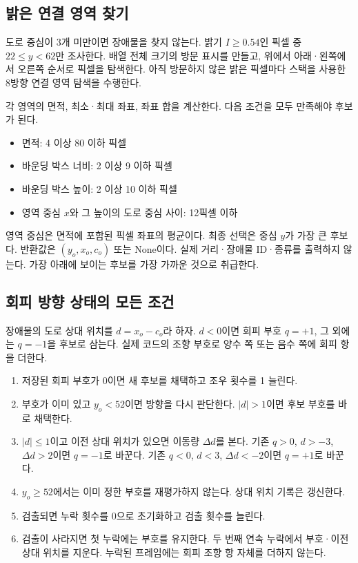 \documentclass[11pt,a4paper]{article}
\begin{document}
\subsection{밝은 연결 영역 찾기}
도로 중심이 3개 미만이면 장애물을 찾지 않는다. 밝기 $I\ge0.54$인 픽셀 중 $22\le y<62$만 조사한다. 배열 전체 크기의 방문 표시를 만들고, 위에서 아래·왼쪽에서 오른쪽 순서로 픽셀을 탐색한다. 아직 방문하지 않은 밝은 픽셀마다 스택을 사용한 8방향 연결 영역 탐색을 수행한다.

각 영역의 면적, 최소·최대 좌표, 좌표 합을 계산한다. 다음 조건을 모두 만족해야 후보가 된다.
\begin{itemize}
\item 면적: 4 이상 80 이하 픽셀
\item 바운딩 박스 너비: 2 이상 9 이하 픽셀
\item 바운딩 박스 높이: 2 이상 10 이하 픽셀
\item 영역 중심 $x$와 그 높이의 도로 중심 사이: 12픽셀 이하
\end{itemize}
영역 중심은 면적에 포함된 픽셀 좌표의 평균이다. 최종 선택은 중심 $y$가 가장 큰 후보다. 반환값은 $(y_o,x_o,c_o)$ 또는 None이다. 실제 거리·장애물 ID·종류를 출력하지 않는다. 가장 아래에 보이는 후보를 가장 가까운 것으로 취급한다.

\subsection{회피 방향 상태의 모든 조건}
장애물의 도로 상대 위치를 $d=x_o-c_o$라 하자. $d<0$이면 회피 부호 $q=+1$, 그 외에는 $q=-1$을 후보로 삼는다. 실제 코드의 조향 부호로 양수 쪽 또는 음수 쪽에 회피 항을 더한다.

\begin{enumerate}
\item 저장된 회피 부호가 0이면 새 후보를 채택하고 조우 횟수를 1 늘린다.
\item 부호가 이미 있고 $y_o<52$이면 방향을 다시 판단한다. $|d|>1$이면 후보 부호를 바로 채택한다.
\item $|d|\le1$이고 이전 상대 위치가 있으면 이동량 $\Delta d$를 본다. 기존 $q>0$, $d>-3$, $\Delta d>2$이면 $q=-1$로 바꾼다. 기존 $q<0$, $d<3$, $\Delta d<-2$이면 $q=+1$로 바꾼다.
\item $y_o\ge52$에서는 이미 정한 부호를 재평가하지 않는다. 상대 위치 기록은 갱신한다.
\item 검출되면 누락 횟수를 0으로 초기화하고 검출 횟수를 늘린다.
\item 검출이 사라지면 첫 누락에는 부호를 유지한다. 두 번째 연속 누락에서 부호·이전 상대 위치를 지운다. 누락된 프레임에는 회피 조향 항 자체를 더하지 않는다.
\end{enumerate}
\end{document}

